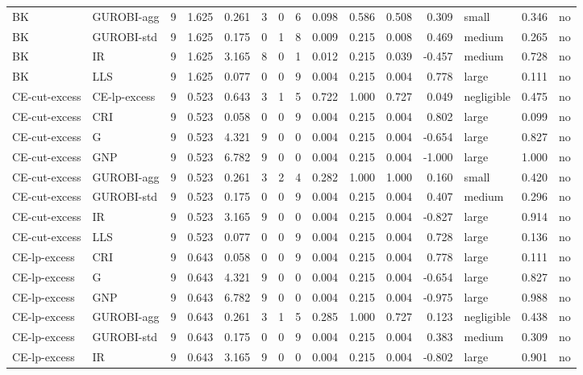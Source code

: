 \begin{table}[htbp]
\begin{tabular}{llrrrrrrrrrrlrr}
BK & GUROBI-agg & 9 & 1.625 & 0.261 & 3 & 0 & 6 & 0.098 & 0.586 & 0.508 & 0.309 & small & 0.346 & no \\
BK & GUROBI-std & 9 & 1.625 & 0.175 & 0 & 1 & 8 & 0.009 & 0.215 & 0.008 & 0.469 & medium & 0.265 & no \\
BK & IR & 9 & 1.625 & 3.165 & 8 & 0 & 1 & 0.012 & 0.215 & 0.039 & -0.457 & medium & 0.728 & no \\
BK & LLS & 9 & 1.625 & 0.077 & 0 & 0 & 9 & 0.004 & 0.215 & 0.004 & 0.778 & large & 0.111 & no \\
CE-cut-excess & CE-lp-excess & 9 & 0.523 & 0.643 & 3 & 1 & 5 & 0.722 & 1.000 & 0.727 & 0.049 & negligible & 0.475 & no \\
CE-cut-excess & CRI & 9 & 0.523 & 0.058 & 0 & 0 & 9 & 0.004 & 0.215 & 0.004 & 0.802 & large & 0.099 & no \\
CE-cut-excess & G & 9 & 0.523 & 4.321 & 9 & 0 & 0 & 0.004 & 0.215 & 0.004 & -0.654 & large & 0.827 & no \\
CE-cut-excess & GNP & 9 & 0.523 & 6.782 & 9 & 0 & 0 & 0.004 & 0.215 & 0.004 & -1.000 & large & 1.000 & no \\
CE-cut-excess & GUROBI-agg & 9 & 0.523 & 0.261 & 3 & 2 & 4 & 0.282 & 1.000 & 1.000 & 0.160 & small & 0.420 & no \\
CE-cut-excess & GUROBI-std & 9 & 0.523 & 0.175 & 0 & 0 & 9 & 0.004 & 0.215 & 0.004 & 0.407 & medium & 0.296 & no \\
CE-cut-excess & IR & 9 & 0.523 & 3.165 & 9 & 0 & 0 & 0.004 & 0.215 & 0.004 & -0.827 & large & 0.914 & no \\
CE-cut-excess & LLS & 9 & 0.523 & 0.077 & 0 & 0 & 9 & 0.004 & 0.215 & 0.004 & 0.728 & large & 0.136 & no \\
CE-lp-excess & CRI & 9 & 0.643 & 0.058 & 0 & 0 & 9 & 0.004 & 0.215 & 0.004 & 0.778 & large & 0.111 & no \\
CE-lp-excess & G & 9 & 0.643 & 4.321 & 9 & 0 & 0 & 0.004 & 0.215 & 0.004 & -0.654 & large & 0.827 & no \\
CE-lp-excess & GNP & 9 & 0.643 & 6.782 & 9 & 0 & 0 & 0.004 & 0.215 & 0.004 & -0.975 & large & 0.988 & no \\
CE-lp-excess & GUROBI-agg & 9 & 0.643 & 0.261 & 3 & 1 & 5 & 0.285 & 1.000 & 0.727 & 0.123 & negligible & 0.438 & no \\
CE-lp-excess & GUROBI-std & 9 & 0.643 & 0.175 & 0 & 0 & 9 & 0.004 & 0.215 & 0.004 & 0.383 & medium & 0.309 & no \\
CE-lp-excess & IR & 9 & 0.643 & 3.165 & 9 & 0 & 0 & 0.004 & 0.215 & 0.004 & -0.802 & large & 0.901 & no \\

\end{tabular}
\end{table}
